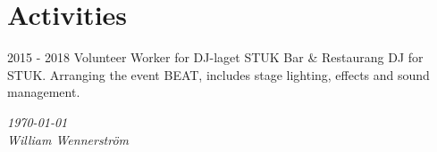 \documentclass[]{friggeri-cv}
\begin{document}
\section{Activities}
\begin{entrylist}
    \entry
    {2015 - 2018}
    {Volunteer Worker for DJ-laget}
    {STUK Bar \& Restaurang}
    {DJ for STUK. Arranging the event BEAT, includes stage lighting, effects and sound management.}
\end{entrylist}

\begin{flushright}
\emph{\today} \\
\emph{William Wennerström}
\end{flushright}
\end{document}
